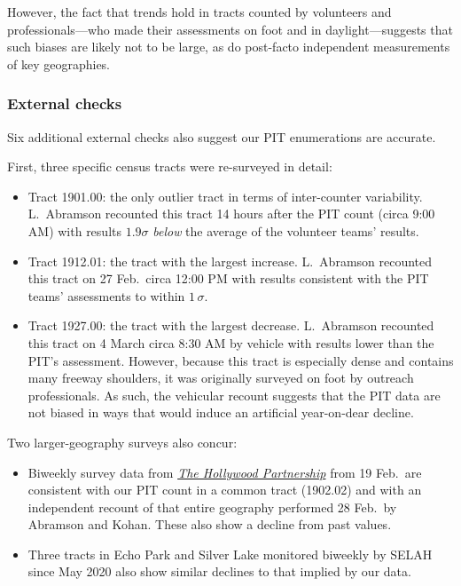\documentclass[11pt,twocolumn]{article}
\begin{document}
However, the fact that trends hold in tracts counted by volunteers and professionals---who made 
their assessments on foot and in daylight---suggests that such biases are likely not to be large,
as do post-facto independent measurements of key geographies.

\subsubsection{External checks}

Six additional external checks also suggest our PIT enumerations are accurate.

First, three specific census tracts were re-surveyed in detail:
\begin{itemize}
	\item Tract 1901.00: the only outlier tract in terms of inter-counter variability. L.~Abramson
		  recounted this tract 14 hours after the PIT count (circa 9:00 AM) with results 
		  $1.9\sigma$ {\it below} the average of the volunteer teams' results.
	\item Tract 1912.01: the tract with the largest increase. L.~Abramson recounted this tract on 
		27 Feb.\ circa 12:00 PM with results consistent with the PIT teams' assessments
		to within $1\,\sigma$.
	\item Tract 1927.00: the tract with the largest decrease. L.~Abramson recounted this tract
		on 4 March circa 8:30 AM by vehicle with results lower than the PIT's assessment. 
		However, because this tract is especially dense and contains many freeway shoulders,
		it was originally surveyed on foot by outreach professionals. As such, the vehicular recount
		suggests that the PIT data are not biased in ways that would induce an artificial 
		year-on-dear decline.				
\end{itemize}

Two larger-geography surveys also concur:
\begin{itemize}
	\item Biweekly survey data from \href{https://hollywoodpartnership.com/}{\it The Hollywood Partnership} 
		from 19 Feb.\ are consistent with our PIT count in a common tract (1902.02) and with an independent 
		recount of that entire geography performed 28 Feb.\ by Abramson and Kohan. These also show 
		a decline from past values.
	\item Three tracts in Echo Park and Silver Lake monitored biweekly by SELAH since May 2020 
		also show similar declines to that implied by our data. 
\end{itemize}
%
%
\end{document}
